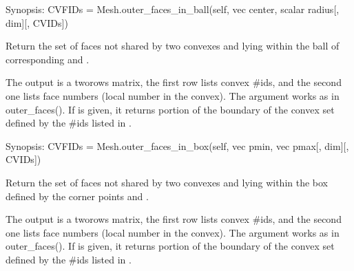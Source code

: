 \documentclass[a4paper,11pt,english]{sphinxmanual}
\begin{document}
\begin{fulllineitems}
\begin{fulllineitems}
\end{fulllineitems}


\begin{fulllineitems}
\label{\detokenize{python/cmdref_Mesh:getfem.Mesh.outer_faces_in_ball}}
Synopsis: CVFIDs = Mesh.outer\_faces\_in\_ball(self, vec center, scalar radius{[}, dim{]}{[}, CVIDs{]})

Return the set of faces not shared by two convexes and lying within the ball of corresponding  and .

The output  is a two\sphinxhyphen{}rows matrix, the first row lists convex
\#ids, and the second one lists face numbers (local number in the
convex). The argument  works as in outer\_faces().
If  is given, it returns portion of the boundary of
the convex set defined by the \#ids listed in .

\end{fulllineitems}


\begin{fulllineitems}
\label{\detokenize{python/cmdref_Mesh:getfem.Mesh.outer_faces_in_box}}
Synopsis: CVFIDs = Mesh.outer\_faces\_in\_box(self, vec pmin, vec pmax{[}, dim{]}{[}, CVIDs{]})

Return the set of faces not shared by two convexes and lying within the box defined by the corner points  and .

The output  is a two\sphinxhyphen{}rows matrix, the first row lists convex
\#ids, and the second one lists face numbers (local number in the
convex). The argument  works as in outer\_faces().
If  is given, it returns portion of the boundary of
the convex set defined by the \#ids listed in .


\end{fulllineitems}
\end{fulllineitems}
\end{document}
